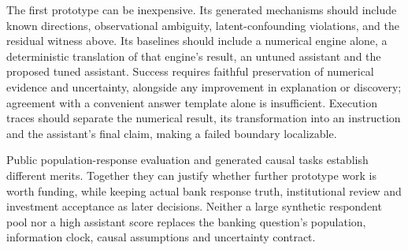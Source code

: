 The first prototype can be inexpensive. Its generated mechanisms should
include known directions, observational ambiguity, latent-confounding
violations, and the residual witness above. Its baselines should include a
numerical engine alone, a deterministic translation of that engine's result,
an untuned assistant and the proposed tuned assistant. Success requires
faithful preservation of numerical evidence and uncertainty, alongside any
improvement in explanation or discovery; agreement with a convenient answer
template alone is insufficient. Execution traces should separate the numerical
result, its transformation into an instruction and the assistant's final
claim, making a failed boundary localizable.

Public population-response evaluation and generated causal tasks establish
different merits. Together they can justify whether further prototype work is
worth funding, while keeping actual bank response truth, institutional review
and investment acceptance as later decisions. Neither a large synthetic
respondent pool nor a high assistant score replaces the banking question's
population, information clock, causal assumptions and uncertainty contract.
